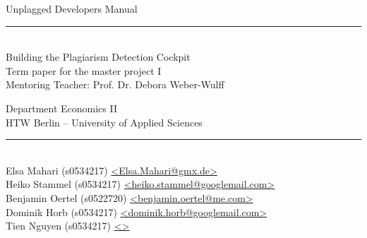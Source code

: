 \begin{titlepage}
\vspace*{2cm}

\begin{center}
\Huge
Unplagged Developers Manual\\
\large
\vspace{0.5cm}
\rule[3mm]{1cm}{0.05mm}\\
Building the Plagiarism Detection Cockpit\\
\normalsize
\vfill
Term paper for the master project I \\ Mentoring Teacher: Prof. Dr. Debora Weber-Wulff\\
\vfill

Department Economics II\\
HTW Berlin -- University of Applied Sciences\\

\rule{8.5cm}{0.2mm}\\
Elsa Mahari (s0534217) \href{mailto:elsa.mahari@gmx.de}{\textless Elsa.Mahari@gmx.de\textgreater}\\
Heiko Stammel (s0534217) \href{mailto:heiko.stammel@googlemail.com}{\textless heiko.stammel@googlemail.com\textgreater}\\
Benjamin Oertel (s0522720) \href{mailto:benjamin.oertel@me.com}{\textless benjamin.oertel@me.com\textgreater}\\
Dominik Horb (s0534217) \href{mailto:dominik.horb@googlemail.com}{\textless dominik.horb@googlemail.com\textgreater}\\
Tien Nguyen (s0534217) \href{mailto:}{\textless \textgreater}\\


\end{center}
\end{titlepage}